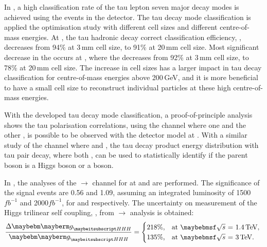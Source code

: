 
In , a high classification rate of the tau lepton seven major decay modes is achieved using the \eeTauTau events in the \ILD detector. The tau decay mode classification is applied the \ECAL optimisation study with different \ECAL cell sizes and different centre-of-mass energies. At , the tau hadronic decay correct classification efficiency, \tauHad, decreases from 94\% at 3\,mm \ECAL cell size, to 91\% at 20\,mm cell size. Most significant decrease in the \tauHad occurs at  , where the \tauHad decreases from 92\% at 3\,mm cell size, to 78\% at 20\,mm cell size. The increase in \ECAL cell sizes has a larger impact in tau decay classification for centre-of-mass energies above 200\,GeV, and it is more beneficial to have a small \ECAL cell size to reconstruct individual particles at these high centre-of-mass energies.

With the developed tau decay mode classification, a proof-of-principle analysis shows the tau polarisation correlations, using the \eeZZ channel where one \ZToqq and the other \ZToTauTau,  is possible to be observed with the \ILD detector model at . With a similar study of the \eeHZ channel where \ZToqq and \HiggsToTauTau,  the  tau decay product energy distribution with tau pair decay, where both \tauToPion, can be used to statistically identify if the parent boson is a Higgs boson or a \PZ boson.



 In , the analyses of the \eeToHH $\to$ \HepProcess{ \Pbottom \APbottom \PWplus \PWminus \Pnue \APnue} channel for \CLIC at  and  are performed. The significance of the signal events are 0.56 and 1.09,  assuming an integrated luminosity of 1500$fb^{-1}$ and 2000$fb^{-1}$, for   and  respectively.  The uncertainty on measurement of the Higgs trilinear self coupling, \gHHH, from  \eeToHH $\to$ \HepProcess{ \Pbottom \APbottom \PWplus \PWminus \Pnue \APnue} analysis is obtained:
\begin{equation}
\frac{\Delta\gHHH}{\gHHH}=
\begin{cases}
  218\%, & \mbox{at \rootS{1.4}, }  \\
  135\%, & \mbox{at \rootS{3}}.
\end{cases}
\end{equation}

